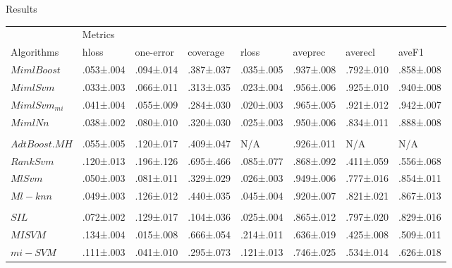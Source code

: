 \begin{frame}{Results}
\begin{tiny}
	\begin{table}[]
\centering
\begin{tabular}{llllllll}
\hline
 & \multicolumn{7}{l}{Metrics} \\ \cline{2-8} 
Algorithms & hloss & one-error & coverage & rloss & aveprec & averecl & aveF1 \\ \hline
$MimlBoost$ & .053±.004 & .094±.014 & .387±.037 & .035±.005 & .937±.008 & .792±.010 & .858±.008 \\
$MimlSvm$ & .033±.003 & .066±.011 & .313±.035 & .023±.004 & .956±.006 & .925±.010 & .940±.008 \\
$MimlSvm_{mi}$ & .041±.004 & .055±.009 & .284±.030 & .020±.003 & .965±.005 & .921±.012 & .942±.007 \\
$MimlNn$ & .038±.002 & .080±.010 & .320±.030 & .025±.003 & .950±.006 & .834±.011 & .888±.008 \\
 &  &  &  &  &  &  &  \\
$AdtBoost.MH$ &  .055±.005 & .120±.017 & .409±.047 & N/A & .926±.011 & N/A & N/A\\
$RankSvm$ & .120±.013 & .196±.126 & .695±.466 & .085±.077 & .868±.092 & .411±.059 & .556±.068 \\
$MlSvm$ & .050±.003 & .081±.011 & .329±.029 & .026±.003 & .949±.006 & .777±.016 & .854±.011\\
$Ml-knn$ & .049±.003 & .126±.012 & .440±.035 & .045±.004 & .920±.007 & .821±.021 & .867±.013 \\
 &  &  &  &  &  &  &  \\
$SIL$ & .072±.002 & .129±.017 & .104±.036 & .025±.004 & .865±.012 & .797±.020 & .829±.016 \\
$MISVM$ & .134±.004 & .015±.008 & .666±.054 & .214±.011 & .636±.019 & .425±.008 & .509±.011 \\
$mi-SVM$ & .111±.003 & .041±.010 & .295±.073 & .121±.013 & .746±.025 & .534±.014 & .626±.018 \\ \hline
\end{tabular}
\end{table}
\end{tiny}
\end{frame}

